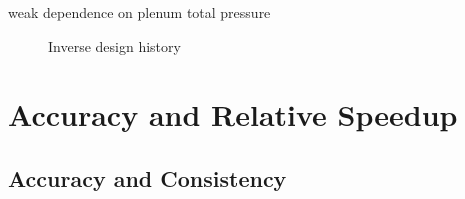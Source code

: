 \documentclass{beamer}
\begin{document}
\begin{frame}
{\begin{itemize}
      weak dependence on plenum total pressure
  \end{itemize}
  \vspace{-1cm}
\begin{figure}
  \centering
  \caption{Inverse design history}
\end{figure}
}
\end{frame}

\section{Accuracy and Relative Speedup}

\subsection{Accuracy and Consistency}
\end{document}
